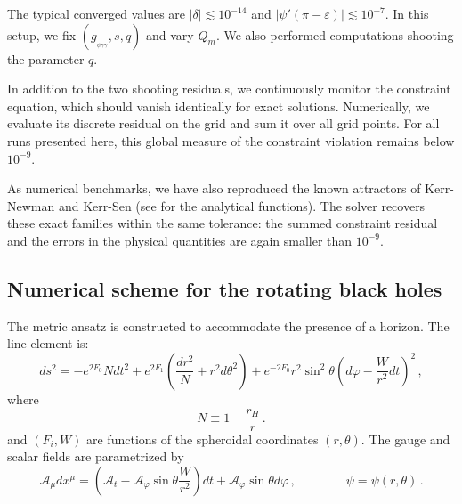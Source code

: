 \documentclass[11pt]{article}
\numberwithin{equation}{section} %
\begin{document}
The typical converged values are $|\delta|\lesssim 10^{-14}$ and $|\psi'(\pi-\varepsilon)|\lesssim10^{-7}$. In this setup, we fix $(g_{_{\psi\gamma\gamma}},s,q)$ and vary $Q_m$. We also performed computations shooting the parameter $q$. 


In addition to the two shooting residuals, we continuously monitor the constraint equation, which should vanish identically for exact solutions. Numerically, we evaluate its discrete residual on the grid and sum it over all grid points. For all runs presented here, this global measure of the constraint violation remains below $10^{-9}$.


As numerical benchmarks, we have also reproduced the known attractors of Kerr-Newman and Kerr-Sen (see \cite{Astefanesei:2006dd} for the analytical functions). The solver recovers these exact families within the same tolerance: the summed constraint residual and the errors in the physical quantities are again smaller than $10^{-9}$.


\subsection{Numerical scheme for the rotating black holes}

The metric ansatz is constructed to accommodate the presence of a horizon. The line element is:
%
\begin{equation}\label{line_BH}
d s^2=-e^{2 F_0} N d t^2+e^{2 F_1}\left(\frac{d r^2}{N}+r^2 d \theta^2\right)+e^{-2 F_0} r^2 \sin ^2 \theta\left(d \varphi-\dfrac{W}{r^2} d t\right)^2\,,
\end{equation}
%
where
%
\begin{equation}
N \equiv 1-\dfrac{r_H}{r}\,.
\end{equation}
	and $(F_i, W)$ are functions of the spheroidal coordinates $(r, \theta)$. The gauge and scalar fields are parametrized by
%
\begin{equation}
\mathcal{A}_\mu d x^\mu=\left(\mathcal{A}_t- \mathcal{A}_{\varphi} \sin\theta\dfrac{W}{r^2}\right)d t+\mathcal{A}_{\varphi}\sin\theta d \varphi\,,\qquad\qquad \psi=\psi(r,\theta)\,.
\end{equation}
\end{document}
